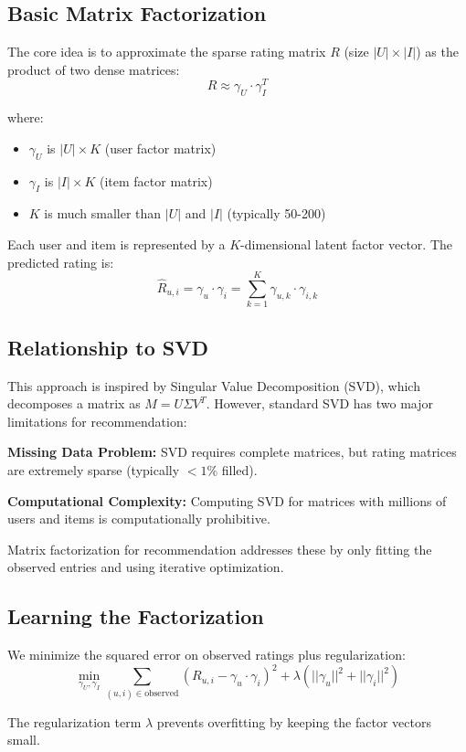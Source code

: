 \documentclass[11pt,a4paper]{article}
\begin{document}
\subsection{Basic Matrix Factorization}
The core idea is to approximate the sparse rating matrix $R$ (size $|U| \times |I|$) as the product of two dense matrices:
$$R \approx \gamma_U \cdot \gamma_I^T$$

where:
\begin{itemize}
\item $\gamma_U$ is $|U| \times K$ (user factor matrix)
\item $\gamma_I$ is $|I| \times K$ (item factor matrix)  
\item $K$ is much smaller than $|U|$ and $|I|$ (typically 50-200)
\end{itemize}

Each user and item is represented by a $K$-dimensional latent factor vector. The predicted rating is:
$$\hat{R}_{u,i} = \gamma_u \cdot \gamma_i = \sum_{k=1}^K \gamma_{u,k} \cdot \gamma_{i,k}$$

\subsection{Relationship to SVD}
This approach is inspired by Singular Value Decomposition (SVD), which decomposes a matrix as $M = U\Sigma V^T$. However, standard SVD has two major limitations for recommendation:

\textbf{Missing Data Problem:} SVD requires complete matrices, but rating matrices are extremely sparse (typically $<1\%$ filled).

\textbf{Computational Complexity:} Computing SVD for matrices with millions of users and items is computationally prohibitive.

Matrix factorization for recommendation addresses these by only fitting the observed entries and using iterative optimization.

\subsection{Learning the Factorization}
We minimize the squared error on observed ratings plus regularization:
$$\min_{\gamma_U, \gamma_I} \sum_{(u,i) \in \text{observed}} (R_{u,i} - \gamma_u \cdot \gamma_i)^2 + \lambda(||\gamma_u||^2 + ||\gamma_i||^2)$$

The regularization term $\lambda$ prevents overfitting by keeping the factor vectors small.
\end{document}
